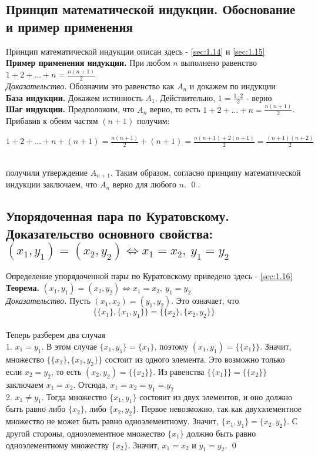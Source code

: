 \documentclass[a4paper]{article}
\begin{document}
\subsection{Принцип математической индукции. Обоснование и пример применения}
Принцип математической индукции описан здесь - \ref{sec:1.14} и \ref{sec:1.15}\\[2mm]
\textbf{Пример применения индукции.} При любом $n$ выполнено равенство $1+2+\ldots+n=\frac{n(n+1)}{2}$\\[2mm]
\label{sec:2.4}\textit{Доказательство.} Обозначим это равенство как $A_n$ и докажем по индукции\\[2mm]
 \textbf{База индукции.} Докажем истинность $A_1$. Действительно, $1=\frac{1\cdot2}{2}$ - верно\\[2mm]
 \textbf{Шаг индукции.} Предположим, что $A_n$ верно, то есть $1+2+\ldots+n=\frac{n(n+1)}{2}$. Прибавив к обеим частям $(n+1)$ получим:\\[2mm]
\centerline{$1+2+\ldots+n+(n+1)=\frac{n(n+1)}{2}+(n+1)=\frac{n(n+1)+2(n+1)}{2}=\frac{(n+1)(n+2)}{2}$}\\[2mm]
получили утверждение $A_{n+1}$. Таким образом, согласно принципу математической индукции заключаем, что $A_n$ верно для любого $n$. \qed.
\subsection{Упорядоченная пара по Куратовскому. Доказательство основного свойства: $(x_1,y_1)=(x_2,y_2)\Leftrightarrow x_1=x_2,\ y_1=y_2$}
\label{sec:2.5}Определение упорядоченной пары по Куратовскому приведено здесь - \ref{sec:1.16}\\[2mm]
\textbf{Теорема.} $(x_1, y_1)=(x_2,y_2)\Leftrightarrow x_1=x_2,\ y_1=y_2$\\[2mm]
\textit{Доказательство.} Пусть $(x_1,x_2)=(y_1,y_2)$. Это означает, что\\[2mm]
$$\{\{x_1\},\{x_1,y_1\}\}=\{\{x_2\},\{x_2,y_2\}\}$$\\[2mm]
Теперь разберем два случая\\[2mm]
 1. $x_1=y_1$. В этом случае $\{x_1,y_1\}=\{x_1\}$, поэтому $(x_1,y_1)=\{\{x_1\}\}$. Значит, множество $\{\{x_2\},\{x_2,y_2\}\}$ состоит из одного элемента. Это возможно только если $x_2=y_2$, то есть $(x_2,y_2)=\{\{x_2\}\}$. Из равенства $\{\{x_1\}\}=\{\{x_2\}\}$ заключаем $x_1=x_2$. Отсюда, $x_1=x_2=y_1=y_2$\\[2mm]
 2. $x_1\ne y_1$. Тогда множество $\{x_1,y_1\}$ состояит из двух элементов, и оно должно быть равно либо $\{x_2\}$, либо $\{x_2,y_2\}$. Первое невозможно, так как двухэлементное множество не может быть равно одноэлементному. Значит, $\{x_1,y_1\}=\{x_2,y_2\}$. С другой стороны, одноэлементное множество $\{x_1\}$ должно быть равно одноэлементному множеству $\{x_2\}$. Значит, $x_1=x_2$ и $y_1=y_2$. \qed
\end{document}
